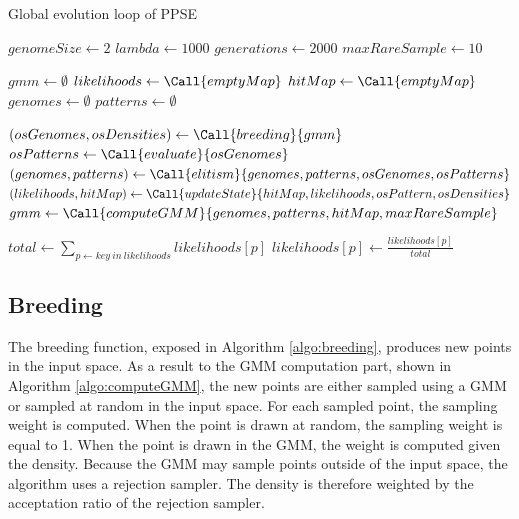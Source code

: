 \documentclass[10pt,letterpaper]{article}
\theoremstyle{definition}
\theoremstyle{remark}
\begin{document}
\begin{algorithm}
    \caption{Global evolution loop of PPSE}
    \label{algo:loop}
    \begin{algorithmic}[1]
        \State $genomeSize \gets 2$
        \State $lambda \gets 1000$
        \State $generations \gets 2000$
        \State $maxRareSample \gets 10$

        \Statex
        \State $gmm \gets \emptyset$
        \State $likelihoods \gets \Call{emptyMap}$
        \State $hitMap \gets \Call{emptyMap}$
        \State $genomes \gets \emptyset$
        \State $patterns \gets \emptyset$
        \Statex
        
            \State $(osGenomes, osDensities) \gets \Call{breeding}{gmm}$
            \State $osPatterns \gets \Call{evaluate}{osGenomes}$ 
            \State $(genomes, patterns) \gets \Call{elitism}{genomes, patterns, osGenomes, osPatterns}$
            \State $(likelihoods, hitMap) \gets \Call{updateState}{hitMap, likelihoods, osPattern, osDensities}$
            \State $gmm \gets \Call{computeGMM}{genomes, patterns, hitMap, maxRareSample}$
        \EndFor

        \Statex
        \State $total \gets \sum_{p \gets key\ in\ likelihoods} likelihoods[p]$ %
           \State $likelihoods[p] \gets \frac{likelihoods[p]}{total}$
        \EndFor

    \end{algorithmic}
\end{algorithm}




\subsection*{Breeding}

The breeding function, exposed in Algorithm \ref{algo:breeding}, produces new points in the input space. 
As a result to the GMM computation part, shown in Algorithm \ref{algo:computeGMM}, the new points are either sampled using a GMM or sampled at random in the input space. 
For each sampled point, the sampling weight is computed. 
When the point is drawn at random, the sampling weight is equal to 1. 
When the point is drawn in the GMM, the weight is computed given the density. 
Because the GMM may sample points outside of the input space, the algorithm uses a rejection sampler. 
The density is therefore weighted by the acceptation ratio of the rejection sampler.
\end{document}
